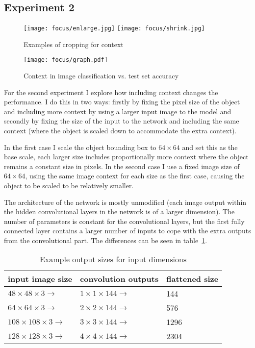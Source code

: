\subsection {Experiment 2}

\begin{figure*}[t]
    \caption{Examples of cropping for context}
\centering
\texttt{[image: focus/enlarge.jpg]}
\texttt{[image: focus/shrink.jpg]}
\label{fig:focus_context}
\end{figure*}




\begin{figure}[h]
    \caption{Context in image classification vs. test set accuracy}
\centering
\texttt{[image: focus/graph.pdf]}
\label{fig:focus_exp2}
\end{figure}

For the second experiment I explore how including context changes the performance. I do this in two ways: firstly by fixing the pixel size of the object and including more context by using a larger input image to the model and secondly by fixing the size of the input to the network and including the same context (where the object is scaled down to accommodate the extra context).

In the first case I scale the object bounding box to $ 64 \times 64 $ and set this as the base scale, each larger size includes proportionally more context where the object remains a constant size in pixels. In the second case I use a fixed image size of $ 64 \times 64 $, using the same image context for each size as the first case, causing the object to be  scaled to be relatively smaller. 

The architecture of the network is mostly unmodified (each image output within the hidden convolutional layers in the network is of a larger dimension). The number of parameters is constant for the convolutional layers, but the first fully connected layer contains a larger number of inputs to cope with the extra outputs from the convolutional part. The differences can be seen in table~\ref{fig:focus_sizes}.


\begin{table}[h]
  \centering
    \caption{Example output sizes for input dimensions }
\begin{tabular}{ l l l } 
 
 \toprule
 input image size & convolution outputs & flattened size \\
 \toprule
 
 $ 48 \times 48 \times 3 \rightarrow $ & $ 1\times1\times144 \rightarrow $ & 144 \\
 $ 64 \times 64 \times 3 \rightarrow $ & $ 2\times2\times144 \rightarrow $ & 576 \\
 $ 108 \times 108 \times 3 \rightarrow $ & $ 3\times3\times144 \rightarrow $ & 1296 \\
 $ 128 \times 128 \times 3 \rightarrow $ & $ 4\times4\times144 \rightarrow $ & 2304 \\
 
\end{tabular}
\label{fig:focus_sizes}
\end{table}

